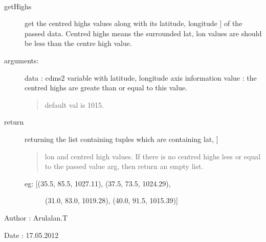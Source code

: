 \documentclass[letterpaper,10pt,english]{sphinxmanual}
\begin{document}
\begin{fulllineitems}
\label{others:weatherutils.getHighs}~\begin{description}
\item[{getHighs}] \leavevmode{[}get the centred highs values along with its latitude, longitude  {]}
of the passed data. Centred highs means the surrounded lat, lon 
values are should be less than the centre high value.

\item[{arguments:}] \leavevmode
data : cdms2 variable with latitude, longitude axis information
value : the centred highs are greate than or equal to this value.
\begin{quote}

default val is 1015.
\end{quote}

\item[{return}] \leavevmode{[}returning the list containing tuples which are containing lat, {]}\begin{quote}

lon and centred high values. If there is no centred highs
less or equal to the passed value arg, then return an empty list.
\end{quote}
\begin{description}
\item[{eg: {[}(35.5, 85.5, 1027.11), (37.5, 73.5, 1024.29),}] \leavevmode
(31.0, 83.0, 1019.28), (40.0, 91.5, 1015.39){]}

\end{description}

\end{description}

Author : Arulalan.T

Date : 17.05.2012

\end{fulllineitems}

\end{document}

